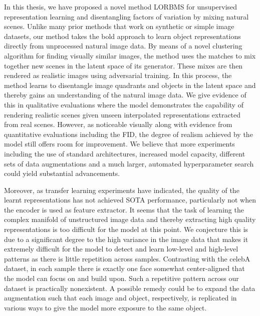 \documentclass[a4paper,12pt]{report}
\begin{document}
In this thesis, we have proposed a novel method LORBMS for unsupervised representation learning and disentangling factors of variation by mixing natural scenes. Unlike many prior methods that work on synthetic or simple image datasets, our method takes the bold approach to learn object representations directly from unprocessed natural image data. By means of a novel clustering algorithm for finding visually similar images, the method uses the matches to mix together new scenes in the latent space of its generator. These mixes are then rendered as realistic images using adversarial training. In this process, the method learns to disentangle image quadrants and objects in the latent space and thereby gains an understanding of the natural image data. We give evidence of this in qualitative evaluations where the model demonstrates the capability of rendering realistic scenes given unseen interpolated representations extracted from real scenes. However, as noticeable visually along with evidence from quantitative evaluations including the FID, the degree of realism achieved by the model still offers room for improvement. We believe that more experiments including the use of standard architectures, increased model capacity, different sets of data augmentations and a much larger, automated hyperparameter search could yield substantial advancements. 

Moreover, as transfer learning experiments have indicated, the quality of the learnt representations has not achieved SOTA performance, particularly not when the encoder is used as feature extractor. It seems that the task of learning the complex manifold of unstructured image data and thereby extracting high quality representations is too difficult for the model at this point. We conjecture this is due to a significant degree to the high variance in the image data that makes it extremely difficult for the model to detect and learn low-level and high-level patterns as there is little repetition across samples. Contrasting with the celebA dataset, in each sample there is exactly one face somewhat center-aligned that the model can focus on and build upon. Such a repetitive pattern across our dataset is practically nonexistent. A possible remedy could be to expand the data augmentation such that each image and object, respectively, is replicated in various ways to give the model more exposure to the same object.
\end{document}
